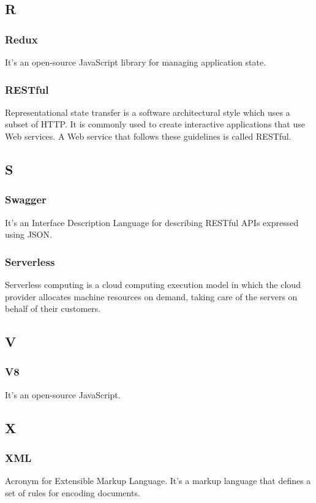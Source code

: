 \subsection*{R}
\subsubsection*{Redux}
It's an open-source JavaScript library for managing application state.

\subsubsection*{RESTful}
Representational state transfer is a software architectural style which uses a subset of HTTP. 
It is commonly used to create interactive applications that use Web services. 
A Web service that follows these guidelines is called RESTful.

\subsection*{S}
\subsubsection*{Swagger}
It's an Interface Description Language for describing RESTful APIs expressed using JSON.

\subsubsection*{Serverless}
Serverless computing is a cloud computing execution model in which the cloud provider allocates 
machine resources on demand, taking care of the servers on behalf of their customers.

\subsection*{V}
\subsubsection*{V8}
It's an open-source JavaScript.

\subsection*{X}
\subsubsection*{XML}
Acronym for Extensible Markup Language. It's a markup language that defines a set of rules for encoding documents.
